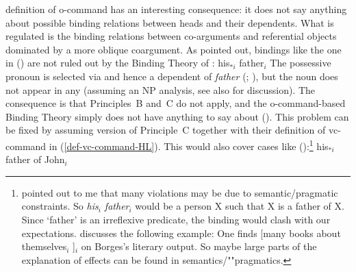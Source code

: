 \documentclass[output=paper,biblatex,babelshorthands,newtxmath,draftmode,colorlinks,citecolor=brown]{langscibook}
\begin{document}
\largerpage[2]
 definition of o-command has an interesting consequence: it does not say anything about possible
binding relations between heads and their dependents. What is regulated is the binding relations
between co-arguments and referential objects dominated by a more oblique coargument. As
\citet[]{Mueller99a} pointed out, bindings like the one in () are not ruled out by
the Binding Theory of \citet[Chapter~6]{ps2}: 
\ea
\label{ex-his-father}
his$_{*i}$ father$_i$
\z
The possessive pronoun is selected via \spr and hence a dependent of \emph{father}
(\citealt{MuellerHeadless,MyPM2021a}; \crossrefchapteralt[\page \pageref{knjiga-avm}]{agreement}), but the noun does not appear in any \argstl (assuming an NP
analysis, see also  for discussion). The consequence is that Principles~B and~C do not apply, and the o-command-based Binding Theory simply
does not have anything to say about (). This problem can be fixed by assuming 
version of Principle~C together with their definition of vc-command in (\ref{def-vc-command-HL}).
This would also cover cases like ():\footnote{%
\gisu pointed out to me that many \iwithini violations may be due to semantic/pragmatic
  constraints. So \emph{his$_i$ father$_i$} would be a person X such that X is a father of X. Since
  `father' is an irreflexive predicate, the binding would clash with our expectations. \citet[]{Culicover1997a-u} discusses the following example:
\ea
One finds [many books about themselves$_{i}$ ]$_{i}$  on Borges’s literary output.
\z
So maybe large parts of the explanation of \iwithini effects can be found in semantics/""pragmatics.
}
\ea
his$_{*i}$ father of John$_i$
\z
\end{document}
